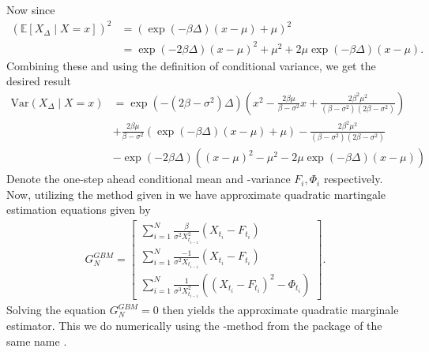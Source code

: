 Now since 
\begin{align}
    \left(\mathbb{E}\left[X_\Delta\middle|X=x\right]\right)^2 &= \left(\exp\left(-\beta\Delta\right)\left(x-\mu\right) + \mu\right)^2 \\
    &= \exp\left(-2\beta\Delta\right)\left(x-\mu\right)^2 + \mu^2 + 2\mu\exp\left(-\beta\Delta\right)\left(x-\mu\right).
\end{align}
Combining these and using the definition of conditional variance, we get the desired result
\begin{align}
    \mathrm{Var}\left(X_\Delta \middle| X = x\right) &= \exp\left(-\left(2\beta - \sigma^2\right)\Delta\right)\left(x^2 - \frac{2\beta\mu}{\beta-\sigma^2}x + \frac{2\beta^2 \mu^2}{\left(\beta-\sigma^2\right)\left(2\beta - \sigma^2\right)}\right) \nonumber \\
    &+ \frac{2\beta\mu}{\beta-\sigma^2}\left(\exp\left(-\beta\Delta\right)\left(x-\mu\right) + \mu\right) - \frac{2\beta^2\mu^2}{\left(\beta-\sigma^2\right)\left(2\beta - \sigma^2\right)} \nonumber\\
    &- \exp\left(-2\beta\Delta\right)\left(\left(x-\mu\right)^2 - \mu^2 - 2\mu\exp\left(-\beta\Delta\right)\left(x-\mu\right)\right)
\end{align} 
Denote the one-step ahead conditional mean and -variance $F_i, \Phi_i$ respectively. Now, utilizing the method given in \cite[example 1.11]{StatisticalMethodsForSDE} we have approximate quadratic martingale estimation equations given by
\begin{align}
    G_N^{GBM} = \begin{bmatrix}
        \sum_{i = 1}^N \frac{\beta}{\sigma^2 X_{t_{i-1}}^2}\left(X_{t_i} - F_{t_i}\right)\\
        \sum_{i = 1}^N \frac{-1}{\sigma^2 X_{t_{i-1}}}\left(X_{t_i} - F_{t_i}\right)\\
        \sum_{i = 1}^N \frac{1}{\sigma^3 X_{t_{i-1}}^2}\left(\left(X_{t_i} - F_{t_i}\right)^2 - \Phi_{t_i}\right)
    \end{bmatrix}.
\end{align}
Solving the equation $G_N^{GBM} = 0$ then yields the approximate quadratic marginale estimator. This we do numerically using the -method from the package of the same name \cite{nleqslv}.
